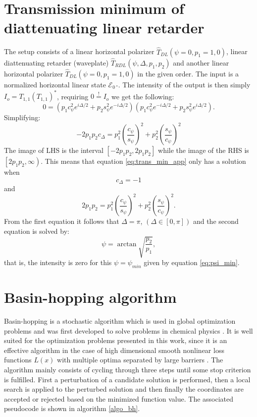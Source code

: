 \section{Transmission minimum of diattenuating linear retarder} 
\label{sec:transmission_min}
The setup consists of a linear horizontal polarizer $\hat{T}_{DL}(\psi=0, p_1=1, 0)$, linear diattenuating retarder (waveplate) $\hat{T}_{RDL}(\psi, \Delta, p_1, p_2)$ and another linear horizontal polarizer $\hat{T}_{DL}(\psi=0, p_1=1, 0)$ in the given order. The input is a normalized horizontal linear state $\bm{\mathcal{E}}_{\SI{0}{\degree}}$. The intensity of the output is then simply $I_o=T_{1,1}(T_{1,1})^*$, requiring $0\overset{!}{=}I_o$ we get the following:
\begin{equation}
    0=(p_1c_\psi^2e^{i\Delta/2}+p_2s_\psi^2e^{-i\Delta/2})(p_1c_\psi^2e^{-i\Delta/2}+p_2s_\psi^2e^{i\Delta/2}).
\end{equation}
Simplifying:
\begin{equation}
    \label{eq:trans_min_app}
    -2p_1p_2c_\Delta = p_1^2\left(\frac{c_\psi}{s_\psi}\right)^2 + p_2^2\left(\frac{s_\psi}{c_\psi}\right)^2
\end{equation}
The image of LHS is the interval $\left[-2p_1p_2, 2p_1p_2\right]$ while the image of the RHS is $\left[2p_1p_2, \infty\right)$. This means that equation \ref{eq:trans_min_app} only has a solution when
\begin{equation}
    c_\Delta=-1
\end{equation}
and
\begin{equation}
    2p_1p_2 = p_1^2\left(\frac{c_\psi}{s_\psi}\right)^2 + p_2^2\left(\frac{s_\psi}{c_\psi}\right)^2.
\end{equation}
From the first equation it follows that $\Delta=\pi$, $(\Delta \in [0,\pi])$ and the second equation is solved by:
\begin{equation}
    \label{eq:psi_min}
    \psi = \arctan \sqrt{\frac{p_2}{p_1}},
\end{equation}
that is, the intensity is zero for this $\psi=\psi_{min}$ given by equation \ref{eq:psi_min}.

\section{Basin-hopping algorithm}
\label{sec:basin_hopping_algo}

Basin-hopping is a stochastic algorithm which is used in global optimization problems and was first developed to solve problems in chemical physics \cite{Wales1997}. It is well suited for the optimization problems presented in this work, since it is an effective algorithm in the case of high dimensional smooth nonlinear loss functions $L(x)$ with multiple optima separated by large barriers \cite{Olson2012, Wu2020}. The algorithm mainly consists of cycling through three steps until some stop criterion is fulfilled. First a perturbation of a candidate solution is performed, then a local search is applied to the perturbed solution and then finally the coordinates are accepted or rejected based on the minimized function value. The associated pseudocode is shown in algorithm \ref{algo_bh}. 

